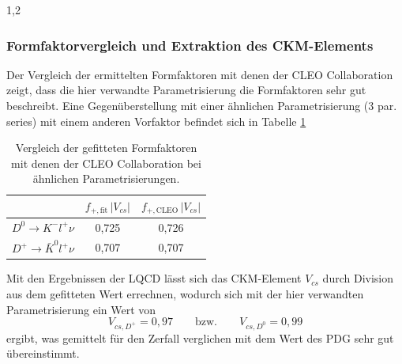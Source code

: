 \documentclass[11pt,a4paper,twoside]{report}
\begin{document}
\begin{spacing}{1,2}
\subsubsection*{Formfaktorvergleich und Extraktion des CKM-Elements}
Der Vergleich der ermittelten Formfaktoren mit denen der CLEO Collaboration \cite{PhysRev_Data} zeigt, dass die hier verwandte Parametrisierung die Formfaktoren
sehr gut beschreibt. Eine Gegenüberstellung mit einer ähnlichen Parametrisierung (3 par. series) mit einem anderen Vorfaktor befindet sich in Tabelle \ref{tab_formvergleich}
\begin{table}[h]
 \begin{tabular}{c|cc}
 \toprule
  & $f_{+,\text{fit}}\,|V_{cs}|$ & $f_{+,\text{CLEO}}\,|V_{cs}|$ \\
  \midrule
  $D^0 \rightarrow K^- l^+ \nu$ & 0,725 & 0,726 \\
  $D^+ \rightarrow \bar K^0 l^+ \nu$ & 0,707 & 0,707  \\
  \bottomrule\bottomrule
 \end{tabular}
\caption{Vergleich der gefitteten Formfaktoren mit denen der CLEO Collaboration bei ähnlichen Parametrisierungen.}
\label{tab_formvergleich}
\end{table}

\noindent
Mit den Ergebnissen der LQCD \cite{PhysRev_Data} lässt sich das CKM-Element $V_{cs}$ durch Division aus dem gefitteten Wert errechnen, wodurch sich mit der hier
verwandten Parametrisierung ein Wert von
\begin{equation}
 V_{cs,D^+} = 0,97 \qquad \text{bzw.} \qquad V_{cs,D^0} = 0,99
\end{equation}
ergibt, was gemittelt für den Zerfall verglichen mit dem Wert des PDG \cite{PDG} sehr gut übereinstimmt.


% 
% 
% 
\newpage
\thispagestyle{empty}
\cleardoublepage


\end{spacing}
\end{document}
